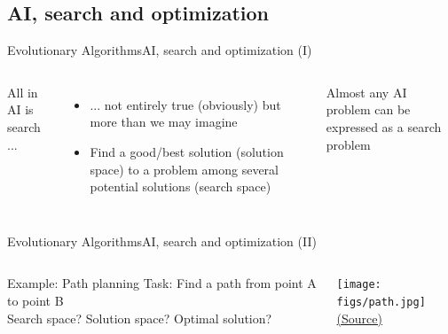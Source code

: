 \documentclass[10pt,compress]{beamer} %
\begin{document}
\subsection{AI, search and optimization}
\begin{frame}{Evolutionary Algorithms}{AI, search and optimization (I)}
    \begin{columns}


    All in AI is search ...
    \begin{itemize}
        \item ... not entirely true (obviously) but more than we may imagine
        \item Find a good/best solution (\alert{solution space}) to a problem among several potential solutions (\alert{search space})
    \end{itemize}

    Almost any AI problem can be expressed as a search problem


    	 
    \end{columns}
\end{frame}


\begin{frame}{Evolutionary Algorithms}{AI, search and optimization (II)}
    \begin{columns}
	\begin{exampleblock}{Example: Path planning}
		Task: Find a path from point A to point B\\
		Search space? Solution space? Optimal solution?
        \end{exampleblock}

	\begin{center}
	\texttt{[image: figs/path.jpg]}\\
	\tiny{\href{http://www.astro.mech.tohoku.ac.jp/~ishigami/research/path\_plan.html}{(Source)}}
	\end{center}
	   \end{columns}
\end{frame}
\end{document}
